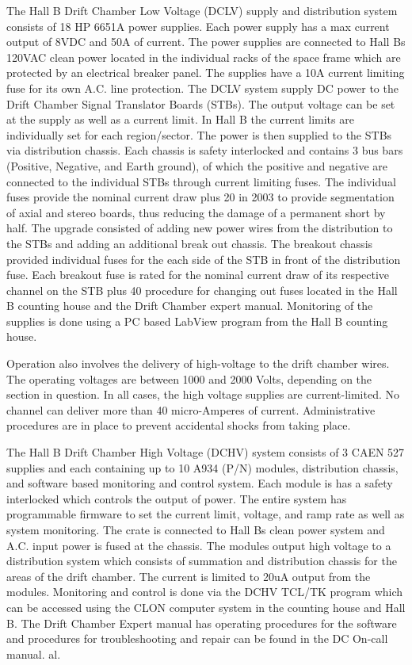 The Hall B Drift Chamber Low Voltage (DCLV) supply and distribution system consists of 18 
HP 6651A power supplies. Each power supply has a max current output of 8VDC and 50A of 
current. The power supplies are connected to Hall Bs 120VAC clean power located in the 
individual racks of the space frame which are protected by an electrical breaker panel. The 
supplies have a 10A current limiting fuse for its own A.C. line protection. The DCLV system 
supply DC power to the Drift Chamber Signal Translator Boards (STBs). The output voltage 
can be set at the supply as well as a current limit. In Hall B the current limits are 
individually set for each region/sector. The power is then supplied to the STBs via 
distribution chassis. Each chassis is safety interlocked and contains 3 bus bars (Positive, 
Negative, and Earth ground), of which the positive and negative are connected to the 
individual STBs through current limiting fuses. The individual fuses provide the nominal 
current draw plus 20%
in 2003 to provide segmentation of axial and stereo boards, thus reducing the damage of a 
permanent short by half. The upgrade consisted of adding new power wires from the 
distribution to the STBs and adding an additional break out chassis. The breakout chassis 
provided individual fuses for the each side of the STB in front of the distribution fuse. 
Each breakout fuse is rated for the nominal current draw of its respective channel on the STB 
plus 40%
procedure for changing out fuses located in the Hall B counting house and the Drift Chamber 
expert manual. Monitoring of the supplies is done using a PC based LabView program from the 
Hall B counting house.

Operation also involves the delivery of high-voltage to the drift chamber wires.
The operating voltages are between 1000 and 2000 Volts, depending on the section
in question.  In all cases, the high voltage supplies are current-limited.  No
channel can deliver more than 40 micro-Amperes of current.  Administrative procedures
are in place to prevent accidental shocks from taking place.

The Hall B Drift Chamber High Voltage (DCHV) system consists of 3 CAEN 527 supplies and each 
containing up to 10 A934 (P/N) modules, distribution chassis, and software based monitoring 
and control system. Each module is has a safety interlocked which controls the output of 
power. The entire system has programmable firmware to set the current limit, voltage, and 
ramp rate as well as system monitoring. The crate is connected to Hall Bs clean power system 
and A.C. input power is fused at the chassis. The modules output high voltage to a 
distribution system which consists of summation and distribution chassis for the areas of 
the drift chamber. The current is limited to 20uA output from the modules. Monitoring and 
control is done via the DCHV TCL/TK program which can be accessed using the CLON computer 
system in the counting house and Hall B. The Drift Chamber Expert manual has operating 
procedures for the software and procedures for troubleshooting and repair can be found in the 
DC On-call manual.
al.

